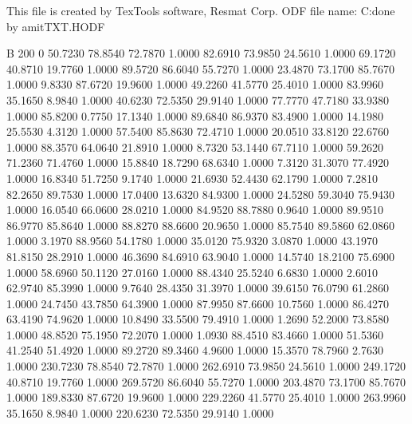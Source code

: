 This file is created by TexTools software, Resmat Corp.
ODF file name: C:\Users\Intel\Desktop\Texture done by amit\Sol TXT\solodf.HODF

B 200 0
   50.7230   78.8540   72.7870    1.0000
   82.6910   73.9850   24.5610    1.0000
   69.1720   40.8710   19.7760    1.0000
   89.5720   86.6040   55.7270    1.0000
   23.4870   73.1700   85.7670    1.0000
    9.8330   87.6720   19.9600    1.0000
   49.2260   41.5770   25.4010    1.0000
   83.9960   35.1650    8.9840    1.0000
   40.6230   72.5350   29.9140    1.0000
   77.7770   47.7180   33.9380    1.0000
   85.8200    0.7750   17.1340    1.0000
   89.6840   86.9370   83.4900    1.0000
   14.1980   25.5530    4.3120    1.0000
   57.5400   85.8630   72.4710    1.0000
   20.0510   33.8120   22.6760    1.0000
   88.3570   64.0640   21.8910    1.0000
    8.7320   53.1440   67.7110    1.0000
   59.2620   71.2360   71.4760    1.0000
   15.8840   18.7290   68.6340    1.0000
    7.3120   31.3070   77.4920    1.0000
   16.8340   51.7250    9.1740    1.0000
   21.6930   52.4430   62.1790    1.0000
    7.2810   82.2650   89.7530    1.0000
   17.0400   13.6320   84.9300    1.0000
   24.5280   59.3040   75.9430    1.0000
   16.0540   66.0600   28.0210    1.0000
   84.9520   88.7880    0.9640    1.0000
   89.9510   86.9770   85.8640    1.0000
   88.8270   88.6600   20.9650    1.0000
   85.7540   89.5860   62.0860    1.0000
    3.1970   88.9560   54.1780    1.0000
   35.0120   75.9320    3.0870    1.0000
   43.1970   81.8150   28.2910    1.0000
   46.3690   84.6910   63.9040    1.0000
   14.5740   18.2100   75.6900    1.0000
   58.6960   50.1120   27.0160    1.0000
   88.4340   25.5240    6.6830    1.0000
    2.6010   62.9740   85.3990    1.0000
    9.7640   28.4350   31.3970    1.0000
   39.6150   76.0790   61.2860    1.0000
   24.7450   43.7850   64.3900    1.0000
   87.9950   87.6600   10.7560    1.0000
   86.4270   63.4190   74.9620    1.0000
   10.8490   33.5500   79.4910    1.0000
    1.2690   52.2000   73.8580    1.0000
   48.8520   75.1950   72.2070    1.0000
    1.0930   88.4510   83.4660    1.0000
   51.5360   41.2540   51.4920    1.0000
   89.2720   89.3460    4.9600    1.0000
   15.3570   78.7960    2.7630    1.0000
  230.7230   78.8540   72.7870    1.0000
  262.6910   73.9850   24.5610    1.0000
  249.1720   40.8710   19.7760    1.0000
  269.5720   86.6040   55.7270    1.0000
  203.4870   73.1700   85.7670    1.0000
  189.8330   87.6720   19.9600    1.0000
  229.2260   41.5770   25.4010    1.0000
  263.9960   35.1650    8.9840    1.0000
  220.6230   72.5350   29.9140    1.0000
